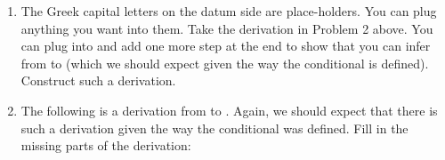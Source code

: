 \begin{enumerate}
\begin{argument*}



\end{argument*}



 \newpage
\item The Greek capital letters on the datum side are place-holders. You can 
 plug anything you want into them. Take the derivation in Problem 2 above. You 
 can plug  into \p{\Delta} and add one more step at the end to show  that 
 you can infer from  to  (which we should expect given the way the conditional is 
 defined).  Construct such a derivation.


\item The following is a derivation from  to 
 . Again, we should expect that there is such a 
 derivation given the way the conditional was defined. Fill in the missing parts 
 of the derivation:

\begin{argument*}




\end{argument*}
\end{enumerate}
